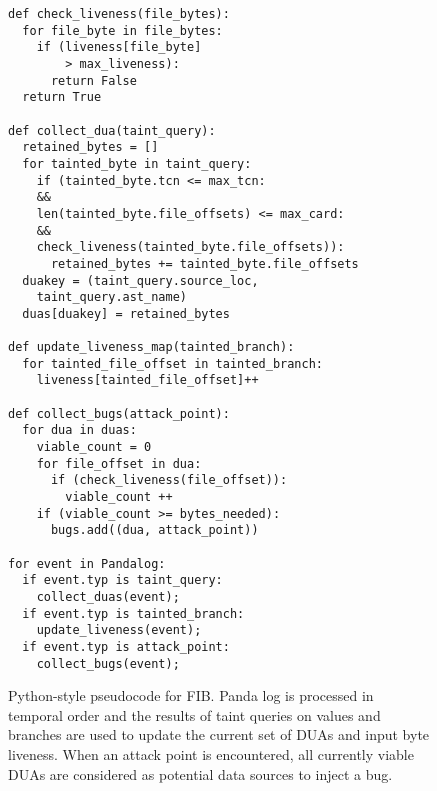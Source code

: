 \lstset{language=Python,
        numbers=left, numberstyle=\tiny, stepnumber=2, numbersep=5pt,
        basicstyle=\ttfamily\footnotesize}

\begin{figure}[t]
\begin{lstlisting}
def check_liveness(file_bytes):
  for file_byte in file_bytes:
    if (liveness[file_byte] 
        > max_liveness):
      return False
  return True

def collect_dua(taint_query):
  retained_bytes = []
  for tainted_byte in taint_query:
    if (tainted_byte.tcn <= max_tcn:
    && 
    len(tainted_byte.file_offsets) <= max_card:
    && 
    check_liveness(tainted_byte.file_offsets)):
      retained_bytes += tainted_byte.file_offsets
  duakey = (taint_query.source_loc, 
    taint_query.ast_name)
  duas[duakey] = retained_bytes

def update_liveness_map(tainted_branch):
  for tainted_file_offset in tainted_branch:
    liveness[tainted_file_offset]++

def collect_bugs(attack_point):
  for dua in duas:
    viable_count = 0
    for file_offset in dua:
      if (check_liveness(file_offset)):
        viable_count ++
    if (viable_count >= bytes_needed):
      bugs.add((dua, attack_point))

for event in Pandalog:
  if event.typ is taint_query:
    collect_duas(event);
  if event.typ is tainted_branch: 
    update_liveness(event);
  if event.typ is attack_point: 
    collect_bugs(event);
\end{lstlisting}
\caption{Python-style pseudocode for FIB. 
Panda log is processed in temporal order and the results of taint queries on values and branches are 
used to update the current set of DUAs and input byte liveness.
When an attack point is encountered, all currently viable DUAs are considered as potential data sources to inject a bug.}
\end{figure}

